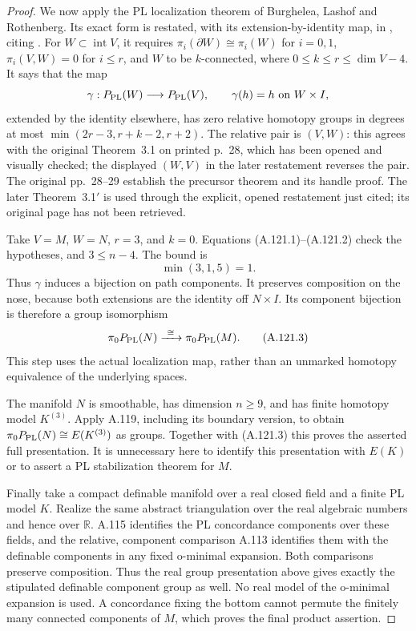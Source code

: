 \begin{proof}
We now apply the PL localization theorem of Burghelea, Lashof and
Rothenberg. Its exact form is restated, with its
extension-by-identity map, in
\cite[Theorem~3.3, p.~17]{GalvinNonino2025}, citing
\cite[Theorem~3.1$'$]{BurgheleaLashofRothenberg1975}.
For $W\subset\operatorname{int}V$, it requires
$\pi_i(\partial W)\cong\pi_i(W)$ for $i=0,1$,
$\pi_i(V,W)=0$ for $i\leq r$, and $W$ to be $k$-connected,
where $0\leq k\leq r\leq\dim V-4$. It says that the map
\[
       \gamma:P_{\rm PL}(W)\longrightarrow P_{\rm PL}(V),
       \qquad \gamma(h)=h\text{ on }W\times I,
\]
extended by the identity elsewhere, has zero relative homotopy
groups in degrees at most
$\min(2r-3,r+k-2,r+2)$.
The relative pair is $(V,W)$: this agrees with the original
Theorem~3.1 on printed p.~28, which has been opened and visually
checked; the displayed $(W,V)$ in the later restatement reverses
the pair. The original pp.~28--29 establish the precursor theorem
and its handle proof. The later Theorem~3.1$'$ is used through the
explicit, opened restatement just cited; its original page has not
been retrieved.

Take $V=M$, $W=N$, $r=3$, and $k=0$. Equations
(A.121.1)--(A.121.2) check the hypotheses, and $3\leq n-4$.
The bound is
\[
                   \min(3,1,5)=1.
\]
Thus $\gamma$ induces a bijection on path components.
It preserves composition on the nose, because both extensions are
the identity off $N\times I$. Its component bijection is therefore
a group isomorphism
\[
          \pi_0P_{\rm PL}(N)\xrightarrow{\ \cong\ }
          \pi_0P_{\rm PL}(M).                          \tag{A.121.3}
\]
This step uses the actual localization map, rather than an unmarked
homotopy equivalence of the underlying spaces.

The manifold $N$ is smoothable, has dimension $n\geq9$, and has
finite homotopy model $K^{(3)}$. Apply A.119, including its boundary
version, to obtain
$\pi_0P_{\rm PL}(N)\cong E(K^{(3)})$ as groups.
Together with (A.121.3) this proves the asserted full presentation.
It is unnecessary here to identify this presentation with
$E(K)$ or to assert a PL stabilization theorem for $M$.

Finally take a compact definable manifold over a real closed field
and a finite PL model $K$. Realize the same abstract triangulation
over the real algebraic numbers and hence over $\mathbb R$.
A.115 identifies the PL concordance components over these fields,
and the relative, component comparison A.113 identifies them with
the definable components in any fixed o-minimal expansion. Both
comparisons preserve composition. Thus the real group presentation
above gives exactly the stipulated definable component group as
well. No real model of the o-minimal expansion is used. A concordance
fixing the bottom cannot permute the finitely many connected
components of $M$, which proves the final product assertion.
\end{proof}


